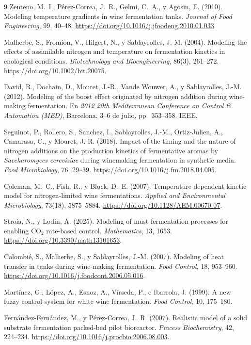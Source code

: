\documentclass[11pt,a4paper]{article}
\begin{document}
\begin{thebibliography}{9}
\small
\setlength{\itemsep}{0.2em}
\setlength{\parskip}{0pt}
Zenteno, M.~I., Pérez-Correa, J.~R., Gelmi, C.~A., y Agosin, E. (2010).
Modeling temperature gradients in wine fermentation tanks.
\emph{Journal of Food Engineering}, 99, 40--48.
\url{https://doi.org/10.1016/j.jfoodeng.2010.01.033}.

Malherbe, S., Fromion, V., Hilgert, N., y Sablayrolles, J.-M. (2004).
Modeling the effects of assimilable nitrogen and temperature on fermentation
kinetics in enological conditions.
\emph{Biotechnology and Bioengineering}, 86(3), 261--272.
\url{https://doi.org/10.1002/bit.20075}.

David, R., Dochain, D., Mouret, J.-R., Vande Wouwer, A., y Sablayrolles, J.-M.
(2012). Modeling of the boost effect originated by nitrogen addition during
wine-making fermentation. En \emph{2012 20th Mediterranean Conference on
Control \& Automation (MED)}, Barcelona, 3--6 de julio, pp.~353--358. IEEE.

Seguinot, P., Rollero, S., Sanchez, I., Sablayrolles, J.-M., Ortiz-Julien, A.,
Camarasa, C., y Mouret, J.-R. (2018). Impact of the timing and the nature of
nitrogen additions on the production kinetics of fermentative aromas by
\emph{Saccharomyces cerevisiae} during winemaking fermentation in synthetic
media. \emph{Food Microbiology}, 76, 29--39.
\url{https://doi.org/10.1016/j.fm.2018.04.005}.

Coleman, M.~C., Fish, R., y Block, D.~E. (2007).
Temperature-dependent kinetic model for nitrogen-limited wine fermentations.
\emph{Applied and Environmental Microbiology}, 73(18), 5875--5884.
\url{https://doi.org/10.1128/AEM.00670-07}.

Stroia, N., y Lodin, A. (2025). Modeling of must fermentation processes for
enabling CO\(_2\) rate-based control. \emph{Mathematics}, 13, 1653.
\url{https://doi.org/10.3390/math13101653}.

Colombié, S., Malherbe, S., y Sablayrolles, J.-M. (2007).
Modeling of heat transfer in tanks during wine-making fermentation.
\emph{Food Control}, 18, 953--960.
\url{https://doi.org/10.1016/j.foodcont.2006.05.016}.

Martínez, G., López, A., Esnoz, A., Vírseda, P., e Ibarrola, J. (1999).
A new fuzzy control system for white wine fermentation.
\emph{Food Control}, 10, 175--180.

Fernández-Fernández, M., y Pérez-Correa, J.~R. (2007).
Realistic model of a solid substrate fermentation packed-bed pilot bioreactor.
\emph{Process Biochemistry}, 42, 224--234.
\url{https://doi.org/10.1016/j.procbio.2006.08.003}.
\end{thebibliography}
\end{document}
